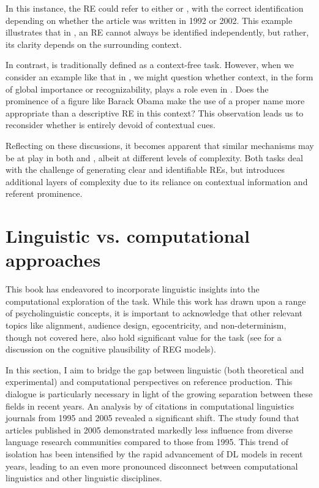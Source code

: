 In this instance, the RE  could refer to either  or , with the correct identification depending on whether the article was written in 1992 or 2002. This example illustrates that in \context, an RE cannot always be identified independently, but rather, its clarity depends on the surrounding context.

In contrast, \shot is traditionally defined as a context-free task. However, when we consider an example like that in , we might question whether context, in the form of global importance or recognizability, plays a role even in \shot. Does the prominence of a figure like Barack Obama make the use of a proper name more appropriate than a descriptive RE in this context? This observation leads us to reconsider whether \shot is entirely devoid of contextual cues.

Reflecting on these discussions, it becomes apparent that similar mechanisms may be at play in both \context and \shot, albeit at different levels of complexity. Both tasks deal with the challenge of generating clear and identifiable REs, but \context introduces additional layers of complexity due to its reliance on contextual information and referent prominence. 

\section{Linguistic vs. computational approaches}\label{sec:lessonslearned}

This book has endeavored to incorporate linguistic insights into the computational exploration of the \context task. While this work has drawn upon a range of psycholinguistic concepts, it is important to acknowledge that other relevant topics like alignment, audience design, egocentricity, and non-determinism, though not covered here, also hold significant value for the \context task (see \citealt{van2012toward} for a discussion on the cognitive plausibility of REG models).

In this section, I aim to bridge the gap between linguistic (both theoretical and experimental) and computational perspectives on reference production. This dialogue is particularly necessary in light of the growing separation between these fields in recent years. An analysis by \citet{reiter-2007-last} of citations in computational linguistics journals from 1995 and 2005 revealed a significant shift. The study found that articles published in 2005 demonstrated markedly less influence from diverse language research communities compared to those from 1995. This trend of isolation has been intensified by the rapid advancement of DL models in recent years, leading to an even more pronounced disconnect between computational linguistics and other linguistic disciplines.

